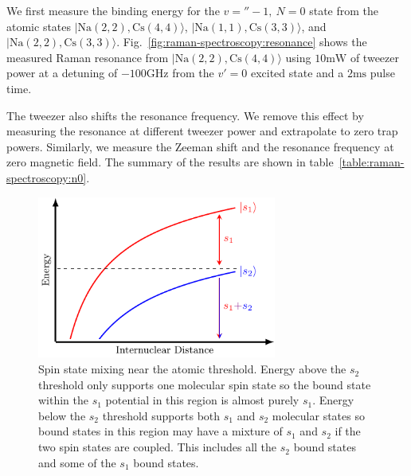 We first measure the binding energy for the $v=''-1,\ N=0$ state
from the atomic states $|\mathrm{Na(2, 2),Cs(4, 4)}\rangle$, $|\mathrm{Na(1, 1),Cs(3, 3)}\rangle$,
and $|\mathrm{Na(2, 2),Cs(3, 3)}\rangle$.
Fig.~\ref{fig:raman-spectroscopy:resonance} shows the measured Raman resonance from
$|\mathrm{Na(2, 2),Cs(4, 4)}\rangle$ using $10 \mathrm{mW}$ of tweezer power at a detuning of
$-100 \mathrm{GHz}$ from the $v'=0$ excited state and a $2 \mathrm{ms}$ pulse time.

The tweezer also shifts the resonance frequency.
We remove this effect by measuring the resonance at different tweezer power
and extrapolate to zero trap powers.
Similarly, we measure the Zeeman shift and the resonance frequency at zero magnetic field.
The summary of the results are shown in table~\ref{table:raman-spectroscopy:n0}.

\begin{figure}
  \centering
  \includegraphics[width=0.7\textwidth]{figures/raman_spectroscopy_spin_mixing.pdf}
  \caption[Spin state mixing near the atomic threshold.]{
    Spin state mixing near the atomic threshold.
    Energy above the $s_2$ threshold only supports one molecular spin state
    so the bound state within the $s_1$ potential in this region is
    almost purely $s_1$.
    Energy below the $s_2$ threshold supports both $s_1$ and $s_2$ molecular states
    so bound states in this region may have a mixture of $s_1$ and $s_2$
    if the two spin states are coupled.
    This includes all the $s_2$ bound states and some of the $s_1$ bound states.
    \label{fig:raman-spectroscopy:spin-mixing}}
\end{figure}

